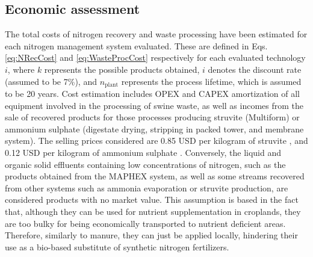 \begin{refsection}[referencesCh6]
%

\subsection{Economic assessment}


The total costs of nitrogen recovery and waste processing have been estimated for each nitrogen management system evaluated. These are defined in Eqs. \ref{eq:NRecCost} and \ref{eq:WasteProcCost} respectively for each evaluated technology $i$, where $k$ represents the possible products obtained, $i$ denotes the discount rate (assumed to be 7\%), and $n_{\text{plant}}$ represents the process lifetime, which is assumed to be 20 years. Cost estimation includes OPEX and CAPEX amortization of all equipment involved in the processing of swine waste, as well as incomes from the sale of recovered products for those processes producing struvite (Multiform) or ammonium sulphate (digestate drying, stripping in packed tower, and membrane system). 
The selling prices considered are 0.85 USD per kilogram of struvite \citep{molinos2011economic}, and 0.12 USD per kilogram of ammonium sulphate \citep{AmmoniumSulphatePrice}. Conversely, the liquid and organic solid effluents containing low concentrations of nitrogen, such as the products obtained from the MAPHEX system, as well as some streams recovered from other systems such as ammonia evaporation or struvite production, are considered products with no market value. This assumption is based in the fact that, although they can be used for nutrient supplementation in croplands, they are too bulky for being economically transported to nutrient deficient areas. Therefore, similarly to manure, they can just be applied locally, hindering their use as a bio-based substitute of synthetic nitrogen fertilizers.


\end{refsection}
